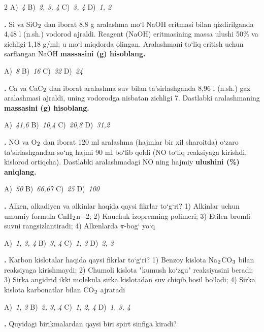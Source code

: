 \documentclass[11pt,a4paper]{article}
\renewcommand{\textsubscript}[1]{\ensuremath{_{\text{\fontsize{8}{8}\selectfont #1}}}}
\newcommand{\qn}[1]{\textbf{\fontsize{11.5}{13}\selectfont #1}}
\newcommand{\qsep}{\par\vspace{13pt}}
\begin{document}
\begin{multicols}{2}
\noindent A)~\textsl{4} \hfill B)~\textsl{2, 3, 4} \hfill C)~\textsl{3, 4} \hfill D)~\textsl{1, 2}\par
\qsep
\noindent\qn{17.} Si va SiO\textsubscript{2} dan iborat 8,8 g aralashma mo`l NaOH eritmasi bilan qizdirilganda 4,48 l (n.sh.) vodorod ajraldi. Reagent (NaOH) eritmasining massa ulushi 50\% va zichligi 1,18 g/ml; u mo`l miqdorda olingan. Aralashmani to`liq eritish uchun sarflangan NaOH \textbf{massasini (g) hisoblang.}

\noindent A)~\textsl{8} \hfill B)~\textsl{16} \hfill C)~\textsl{32} \hfill D)~\textsl{24}\par
\qsep
\noindent\qn{18.} Ca va CaC\textsubscript{2} dan iborat aralashma suv bilan ta'sirlashganda 8,96 l (n.sh.) gaz aralashmasi ajraldi, uning vodorodga nisbatan zichligi 7. Dastlabki aralashmaning \textbf{massasini (g) hisoblang.}

\noindent A)~\textsl{41,6} \hfill B)~\textsl{10,4} \hfill C)~\textsl{20,8} \hfill D)~\textsl{31,2}\par
\qsep
\noindent\qn{19.} NO va O\textsubscript{2} dan iborat 120 ml aralashma (hajmlar bir xil sharoitda) o`zaro ta'sirlashgandan so`ng hajmi 90 ml bo`lib qoldi (NO to`liq reaksiyaga kirishdi, kislorod ortiqcha). Dastlabki aralashmadagi NO ning hajmiy \textbf{ulushini (\%) aniqlang.}

\noindent A)~\textsl{50} \hfill B)~\textsl{66,67} \hfill C)~\textsl{25} \hfill D)~\textsl{100}\par
\qsep
\noindent\qn{20.} Alken, alkadiyen va alkinlar haqida qaysi fikrlar to`g`ri? 1) Alkinlar uchun umumiy formula CnH\textsubscript{2}n+2; 2) Kauchuk izoprenning polimeri; 3) Etilen bromli suvni rangsizlantiradi; 4) Alkenlarda $\pi$-bog` yo`q

\noindent A)~\textsl{1, 3, 4} \hfill B)~\textsl{3, 4} \hfill C)~\textsl{1, 3} \hfill D)~\textsl{2, 3}\par
\qsep
\noindent\qn{21.} Karbon kislotalar haqida qaysi fikrlar to`g`ri? 1) Benzoy kislota Na\textsubscript{2}CO\textsubscript{3} bilan reaksiyaga kirishmaydi; 2) Chumoli kislota "kumush ko`zgu" reaksiyasini beradi; 3) Sirka angidrid ikki molekula sirka kislotadan suv chiqib hosil bo`ladi; 4) Sirka kislota karbonatlar bilan CO\textsubscript{2} ajratadi

\noindent A)~\textsl{1, 3} \hfill B)~\textsl{2, 3, 4} \hfill C)~\textsl{1, 2, 4} \hfill D)~\textsl{1, 3, 4}\par
\qsep
\noindent\qn{22.} Quyidagi birikmalardan qaysi biri spirt sinfiga kiradi?


\end{multicols}
\end{document}
